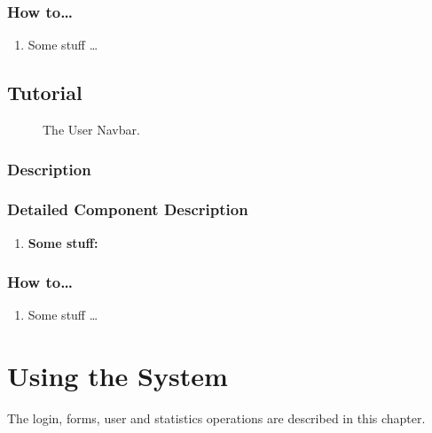 \documentclass[14pt, a4paper]{article}
\begin{document}
	\subsubsection{How to\ldots}
		\begin{enumerate}
			\item Some stuff \ldots
		\end{enumerate}
\subsection{Tutorial}
	\begin{figure}[H]
		\centerline{}
		\caption{The User Navbar.}
  		\label{fig:navbar4}
	\end{figure}
	\subsubsection{Description}
	\subsubsection{Detailed Component Description}
		\begin{enumerate}
			\item \textbf{Some stuff:} 
		\end{enumerate}
	\subsubsection{How to\ldots}
		\begin{enumerate}
			\item Some stuff \ldots
		\end{enumerate}
\newpage


\section{Using the System}
\begin{description}
\item The login, forms, user and statistics operations are described in this chapter.
\end{description}
\end{document}
